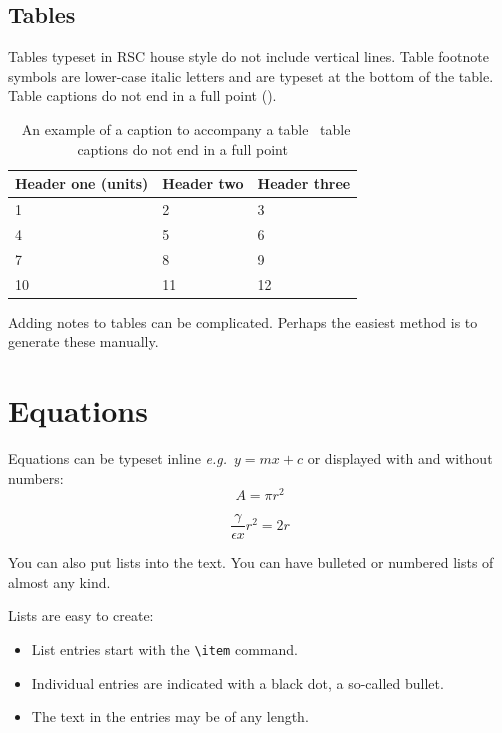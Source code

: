 \documentclass[twoside,twocolumn,9pt]{article}
\begin{document}
\subsection{Tables}
Tables typeset in RSC house style do not include vertical lines. Table footnote symbols are lower-case italic letters and are typeset at the bottom of the table. Table captions do not end in a full point (\cite{dirac,einstein,knuth-fa}).

\begin{table}[ht]
\small
  \caption{\ An example of a caption to accompany a table \textendash\ table captions do not end in a full point}
  \label{tbl:example1}
  \begin{tabular*}{0.48\textwidth}{@{\extracolsep{\fill}}lll}
    \hline
    Header one (units) & Header two & Header three \\
    \hline
    1 & 2 & 3 \\
    4 & 5 & 6 \\
    7 & 8 & 9 \\
    10 & 11 & 12 \\
    \hline
  \end{tabular*}
\end{table}

Adding notes to tables can be complicated.  Perhaps the easiest method is to generate these manually.

\section{Equations}

Equations can be typeset inline \textit{e.g.}\ $ y = mx + c$ or displayed with and without numbers:
\balance
 \[ A = \pi r^2 \]

\begin{equation}
  \frac{\gamma}{\epsilon x} r^2 = 2r
\end{equation}

You can also put lists into the text. You can have bulleted or numbered lists of almost any kind. 

Lists are easy to create:
\begin{itemize}
  \item List entries start with the \verb|\item| command.
  \item Individual entries are indicated with a black dot, a so-called bullet.
  \item The text in the entries may be of any length.
\end{itemize}
\end{document}
